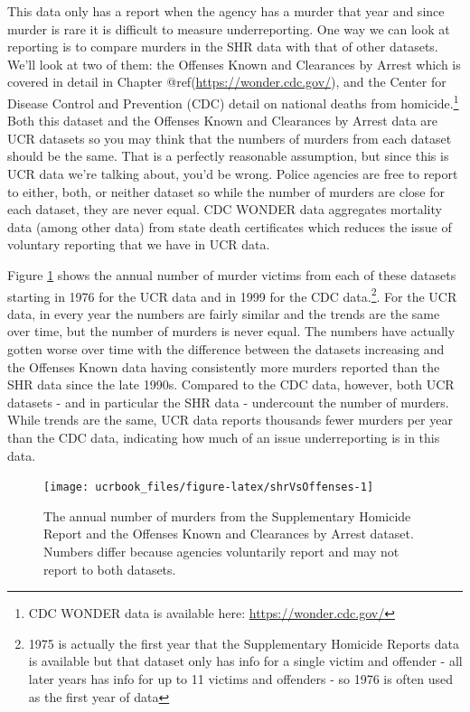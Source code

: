 \documentclass[
  12pt,
  openany]{book}
\begin{document}
This data only has a report when the agency has a murder that year and since murder is rare it is difficult to measure underreporting. One way we can look at reporting is to compare murders in the SHR data with that of other datasets. We'll look at two of them: the Offenses Known and Clearances by Arrest which is covered in detail in Chapter @ref(\url{https://wonder.cdc.gov/}), and the Center for Disease Control and Prevention (CDC) detail on national deaths from homicide.\footnote{CDC WONDER data is available here: \url{https://wonder.cdc.gov/}} Both this dataset and the Offenses Known and Clearances by Arrest data are UCR datasets so you may think that the numbers of murders from each dataset should be the same. That is a perfectly reasonable assumption, but since this is UCR data we're talking about, you'd be wrong. Police agencies are free to report to either, both, or neither dataset so while the number of murders are close for each dataset, they are never equal. CDC WONDER data aggregates mortality data (among other data) from state death certificates which reduces the issue of voluntary reporting that we have in UCR data.

Figure \ref{fig:shrVsOffenses} shows the annual number of murder victims from each of these datasets starting in 1976 for the UCR data and in 1999 for the CDC data.\footnote{1975 is actually the first year that the Supplementary Homicide Reports data is available but that dataset only has info for a single victim and offender - all later years has info for up to 11 victims and offenders - so 1976 is often used as the first year of data}. For the UCR data, in every year the numbers are fairly similar and the trends are the same over time, but the number of murders is never equal. The numbers have actually gotten worse over time with the difference between the datasets increasing and the Offenses Known data having consistently more murders reported than the SHR data since the late 1990s. Compared to the CDC data, however, both UCR datasets - and in particular the SHR data - undercount the number of murders. While trends are the same, UCR data reports thousands fewer murders per year than the CDC data, indicating how much of an issue underreporting is in this data.

\begin{figure}

{\centering \texttt{[image: ucrbook\_files/figure-latex/shrVsOffenses-1]} 

}

\caption{The annual number of murders from the Supplementary Homicide Report and the Offenses Known and Clearances by Arrest dataset. Numbers differ because agencies voluntarily report and may not report to both datasets.}\label{fig:shrVsOffenses}
\end{figure}
\end{document}
